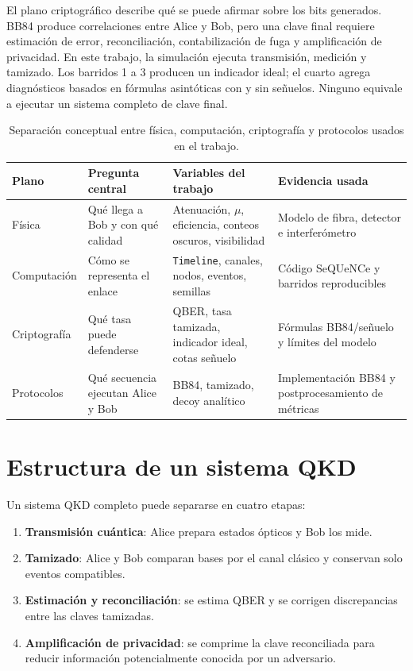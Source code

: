 El plano criptográfico describe qué se puede afirmar sobre los bits generados. BB84 produce correlaciones entre Alice y Bob, pero una clave final requiere estimación de error, reconciliación, contabilización de fuga y amplificación de privacidad. En este trabajo, la simulación ejecuta transmisión, medición y tamizado. Los barridos 1 a 3 producen un indicador ideal; el cuarto agrega diagnósticos basados en fórmulas asintóticas con y sin señuelos. Ninguno equivale a ejecutar un sistema completo de clave final.

\begin{table}[H]
  \centering
  \begin{tabularx}{\textwidth}{p{}p{}XX}
    \toprule
    Plano & Pregunta central & Variables del trabajo & Evidencia usada \\
    \midrule
    Física & Qué llega a Bob y con qué calidad & Atenuación, \(\mu\), eficiencia, conteos oscuros, visibilidad & Modelo de fibra, detector e interferómetro \\
    Computación & Cómo se representa el enlace & \texttt{Timeline}, canales, nodos, eventos, semillas & Código SeQUeNCe y barridos reproducibles \\
    Criptografía & Qué tasa puede defenderse & QBER, tasa tamizada, indicador ideal, cotas señuelo & Fórmulas BB84/señuelo y límites del modelo \\
    Protocolos & Qué secuencia ejecutan Alice y Bob & BB84, tamizado, decoy analítico & Implementación BB84 y postprocesamiento de métricas \\
    \bottomrule
  \end{tabularx}
  \caption{Separación conceptual entre física, computación, criptografía y protocolos usados en el trabajo.}
  \label{tab:planos_trabajo}
\end{table}

\section{Estructura de un sistema QKD}

Un sistema QKD completo puede separarse en cuatro etapas:

\begin{enumerate}
  \item \textbf{Transmisión cuántica}: Alice prepara estados ópticos y Bob los mide.
  \item \textbf{Tamizado}: Alice y Bob comparan bases por el canal clásico y conservan solo eventos compatibles.
  \item \textbf{Estimación y reconciliación}: se estima QBER y se corrigen discrepancias entre las claves tamizadas.
  \item \textbf{Amplificación de privacidad}: se comprime la clave reconciliada para reducir información potencialmente conocida por un adversario.
\end{enumerate}

